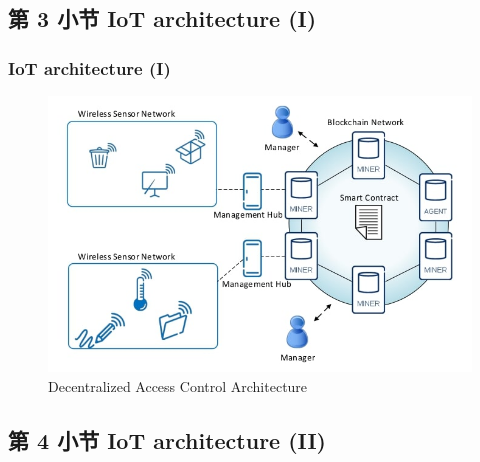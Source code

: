 \documentclass[
    aspectratio=169,                   %
]{beamer}
\begin{document}
\subsection{第 3 小节 IoT architecture (I)}

    \begin{frame}
        \frametitle{IoT architecture (I)}

        
        \begin{figure}
            \centering
            \begin{stampbox}
                \includegraphics[height=0.6\textheight]{architecture.jpg}
            \end{stampbox}
            \caption{Decentralized Access Control Architecture}
        \end{figure}
    \end{frame}

\subsection{第 4 小节 IoT architecture (II)}
\end{document}
